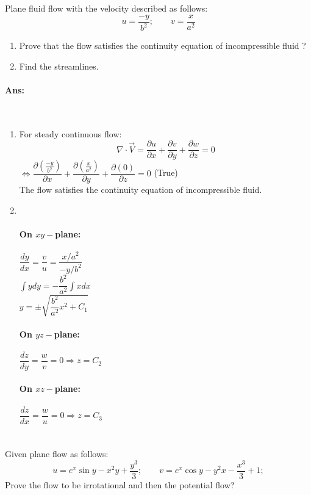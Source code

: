 \section{}
\section{}
Plane fluid flow with the velocity described as follows:
\[u=\dfrac{-y}{b^2};\qquad v =\dfrac{x}{a^2}\]
\begin{enumerate}
	\item Prove that the flow satisfies the continuity equation of incompressible fluid ?
	\item Find the streamlines.
\end{enumerate}
\paragraph{Ans:}$  $
\begin{enumerate}
	\item For steady continuous flow:
	\[\nabla \cdot \vec{V}=\dfrac{\partial u}{\partial x} + \dfrac{\partial v}{\partial y} + \dfrac{\partial w}{\partial z}=0\]
	$ \Leftrightarrow \dfrac{\partial (\frac{-y}{b^2})}{\partial x} + \dfrac{\partial (\frac{x}{a^2})}{\partial y} + \dfrac{\partial (0)}{\partial z} =0$ (True)\\
	The flow satisfies the continuity equation of incompressible fluid.
	\item $ $
	\paragraph{On $ xy- $plane:}
	$ \dfrac{dy}{dx} = \dfrac{v}{u} = \dfrac{x/a^2}{-y/b^2}$\\
	$\displaystyle \int y dy = -\dfrac{b^2}{a^2}\int x dx$\\
	$ y = \pm \sqrt{\dfrac{b^2}{a^2}x^2+C_1} $
	\paragraph{On $ yz- $plane:}
	$ \dfrac{dz}{dy} = \dfrac{w}{v} = 0\Rightarrow z=C_2$
	\paragraph{On $ xz- $plane:}
	$ \dfrac{dz}{dx} = \dfrac{w}{u} = 0\Rightarrow z=C_3$
\end{enumerate}
\section{}
Given plane flow as follows:
\[u=e^x\sin y - x^2y+\dfrac{y^3}{3};\qquad v = e^x\cos y - y^2x-\dfrac{x^3}{3}+1;\]
Prove the flow to be irrotational and then the potential flow?
